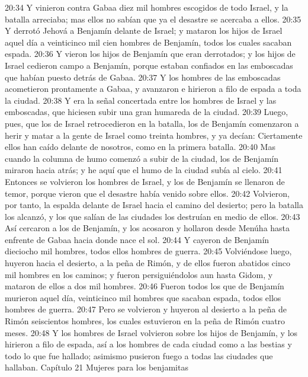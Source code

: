 20:34 Y vinieron contra Gabaa diez mil hombres escogidos de todo Israel, y la batalla arreciaba; mas ellos no sabían que ya el desastre se acercaba a ellos.  
20:35 Y derrotó Jehová a Benjamín delante de Israel; y mataron los hijos de Israel aquel día a veinticinco mil cien hombres de Benjamín, todos los cuales sacaban espada.  
20:36 Y vieron los hijos de Benjamín que eran derrotados; y los hijos de Israel cedieron campo a Benjamín, porque estaban confiados en las emboscadas que habían puesto detrás de Gabaa.  
20:37 Y los hombres de las emboscadas acometieron prontamente a Gabaa, y avanzaron e hirieron a filo de espada a toda la ciudad.  
20:38 Y era la señal concertada entre los hombres de Israel y las emboscadas, que hiciesen subir una gran humareda de la ciudad.  
20:39 Luego, pues, que los de Israel retrocedieron en la batalla, los de Benjamín comenzaron a herir y matar a la gente de Israel como treinta hombres, y ya decían: Ciertamente ellos han caído delante de nosotros, como en la primera batalla.  
20:40 Mas cuando la columna de humo comenzó a subir de la ciudad, los de Benjamín miraron hacia atrás; y he aquí que el humo de la ciudad subía al cielo.  
20:41 Entonces se volvieron los hombres de Israel, y los de Benjamín se llenaron de temor, porque vieron que el desastre había venido sobre ellos.  
20:42 Volvieron, por tanto, la espalda delante de Israel hacia el camino del desierto; pero la batalla los alcanzó, y los que salían de las ciudades los destruían en medio de ellos.  
20:43 Así cercaron a los de Benjamín, y los acosaron y hollaron desde Menúha hasta enfrente de Gabaa hacia donde nace el sol. 
20:44 Y cayeron de Benjamín dieciocho mil hombres, todos ellos hombres de guerra.  
20:45 Volviéndose luego, huyeron hacia el desierto, a la peña de Rimón, y de ellos fueron abatidos cinco mil hombres en los caminos; y fueron persiguiéndolos aun hasta Gidom, y mataron de ellos a dos mil hombres.  
20:46 Fueron todos los que de Benjamín murieron aquel día, veinticinco mil hombres que sacaban espada, todos ellos hombres de guerra.  
20:47 Pero se volvieron y huyeron al desierto a la peña de Rimón seiscientos hombres, los cuales estuvieron en la peña de Rimón cuatro meses.  
20:48 Y los hombres de Israel volvieron sobre los hijos de Benjamín, y los hirieron a filo de espada, así a los hombres de cada ciudad como a las bestias y todo lo que fue hallado; asimismo pusieron fuego a todas las ciudades que hallaban.  
Capítulo 21
Mujeres para los benjamitas  


